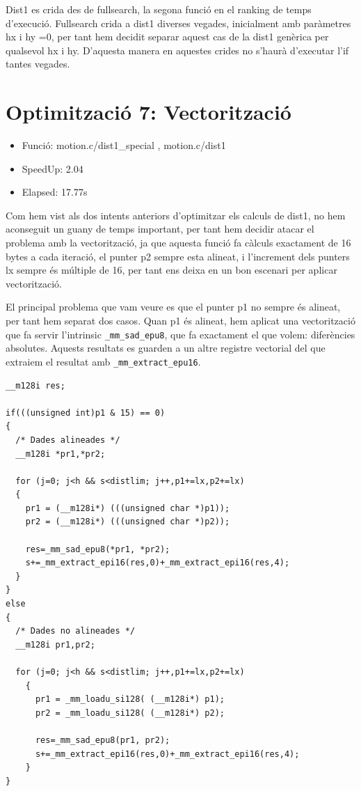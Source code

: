 Dist1 es crida des de fullsearch, la segona funció en el ranking de temps d'execució. Fullsearch crida a dist1 diverses vegades, inicialment amb paràmetres hx i hy =0, per tant hem decidit separar aquest cas de la dist1 genèrica per qualsevol hx i hy. D'aquesta manera en aquestes crides no s'haurà d'executar l'if tantes vegades.

\section{Optimitzaci\'o 7: Vectoritzaci\'o}
\begin{itemize}
\item{Funció: motion.c/dist1\_special , motion.c/dist1}
\item{SpeedUp: 2.04}
\item{Elapsed: 17.77s}
\end{itemize}

Com hem vist als dos intents anteriors d'optimitzar els calculs de dist1, no hem aconseguit un guany de temps important, per tant hem decidir atacar el problema amb la vectorització, ja que aquesta funció fa càlculs exactament de 16 bytes a cada iteració, el punter p2 sempre esta alineat, i l'increment dels punters lx sempre és múltiple de 16, per tant ens deixa en un bon escenari per aplicar vectorització.

El principal problema que vam veure es que el punter p1 no sempre és alineat, per tant hem separat dos casos. Quan p1 és alineat, hem aplicat una vectorització que fa servir l'intrinsic \texttt{\_mm\_sad\_epu8}, que fa exactament el que volem: diferències absolutes. Aquests resultats es guarden a un altre registre vectorial del que extraiem el resultat amb \texttt{\_mm\_extract\_epu16}.

\begin{lstlisting}
__m128i res;  
 
if(((unsigned int)p1 & 15) == 0)
{
  /* Dades alineades */
  __m128i *pr1,*pr2;

  for (j=0; j<h && s<distlim; j++,p1+=lx,p2+=lx)
  {   
    pr1 = (__m128i*) (((unsigned char *)p1));
    pr2 = (__m128i*) (((unsigned char *)p2));
		
    res=_mm_sad_epu8(*pr1, *pr2);
    s+=_mm_extract_epi16(res,0)+_mm_extract_epi16(res,4);
  }
}
else
{
  /* Dades no alineades */
  __m128i pr1,pr2;

  for (j=0; j<h && s<distlim; j++,p1+=lx,p2+=lx)
	{  
	  pr1 = _mm_loadu_si128( (__m128i*) p1);
	  pr2 = _mm_loadu_si128( (__m128i*) p2);
		
	  res=_mm_sad_epu8(pr1, pr2);
	  s+=_mm_extract_epi16(res,0)+_mm_extract_epi16(res,4);
	}  
}   
\end{lstlisting}

